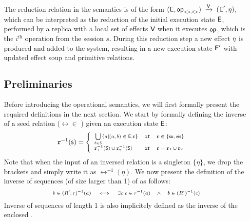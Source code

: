 The reduction relation in the semantics is of the form
{\scriptsize $
({\normalfont \textsf{E}},{\normalfont \textsf{op}}_{<s,i>}) \;\xrightarrow{{\normalfont \textsf{V}}}\; ({\normalfont \textsf{E}}', \eta),
$}
which can be interpreted as the reduction of the initial execution state
${\normalfont \textsf{E}}$, performed by a replica with a local 
set of effects ${\normalfont \textsf{V}}$ when it executes
${\normalfont \textsf{op}}$, which is the $i^{th}$ operation from the session $s$. 
During this reduction step a new effect $\eta$ is produced and added to
the system, resulting in a new execution state ${\normalfont \textsf{E}}'$ with updated effect
soup and primitive relations.





\subsection{Preliminaries}
\label{subsec:prelim}
Before introducing the operational semantics, we will first formally
present the required definitions in the next section. 
We start by formally defining the inverse of a seed relation ($\rel \in$
\seedS{}) given an 
execution state ${\normalfont \textsf{E}}$:
\begin{equation}
\label{eq:r_inv}
\scriptsize
\mathtt{r}^{-1}({\normalfont \textsf{S}}) = 
\begin{cases}
\begin{array}{lcl}
\bigcup\limits_{b\in {\normalfont \textsf{S}}}\{a|(a,b) \in {\normalfont \textsf{E}}.\mathtt{r} \} & \mathtt {if}
&\mathtt{r}\in\{{\textsf{so}},{\normalfont \textsf{vis}}\}\ \\ 
\mathtt{r}_1^{-1}({\normalfont \textsf{S}})\cup \mathtt{r}_2^{-1}({\normalfont \textsf{S}}) & \mathtt {if} & \mathtt{r}=\mathtt{r}_1\cup \mathtt{r}_2
\end{array}
\end{cases}
\end{equation}
Note that when the input of an inversed relation is a singleton
$\{\eta\}$, we drop the brackets and simply write it as
$\rel^{-1}(\eta)$.
We now present the definition of the inverse of 
sequences (of size larger than 1) of \seedS{} as follows:
\begin{equation}
\label{eq:seq_inv}
\scriptsize
\begin{array}{lllll}
b \in  (R';r)^{-1}(a) & \iff & \exists c. c \in r^{-1}(a)
& \wedge & b \in (R')^{-1}(c) 
\end{array}
\end{equation}
Inverse of sequences of length 1 is also implicitely defined as the
inverse of the enclosed \seedS{}.


